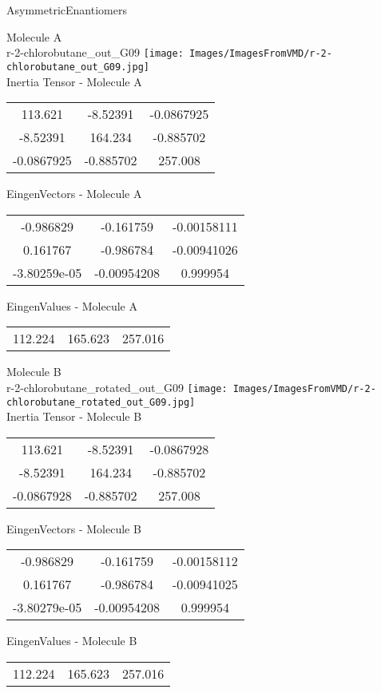 
\vtab[-2cm]
\begin{center}
{\large AsymmetricEnantiomers}
\end{center}
\begin{multicols}{2}
\begin{center}
Molecule A \\ 
r-2-chlorobutane\_out\_G09
\texttt{[image: Images/ImagesFromVMD/r-2-chlorobutane\_out\_G09.jpg]}
\\
Inertia Tensor - Molecule A \\
\vtab
\begin{tabular}{|c c c|}
113.621	 & 	-8.52391	 & 	-0.0867925	 \\
-8.52391	 & 	164.234	 & 	-0.885702	 \\
-0.0867925	 & 	-0.885702	 & 	257.008
\end{tabular}

\vtab
 EingenVectors - Molecule A     \\
\vtab
\begin{tabular}{|c c c|}
-0.986829	 & 	-0.161759	 & 	-0.00158111	 \\
0.161767	 & 	-0.986784	 & 	-0.00941026	 \\
-3.80259e-05	 & 	-0.00954208	 & 	0.999954
\end{tabular}

\vtab
 EingenValues - Molecule A     \\
\vtab
\begin{tabular}{|c c c|}
112.224	 & 	165.623	 & 	257.016
\end{tabular}
\columnbreak

Molecule B \\ 
r-2-chlorobutane\_rotated\_out\_G09
\texttt{[image: Images/ImagesFromVMD/r-2-chlorobutane\_rotated\_out\_G09.jpg]}
\\
Inertia Tensor - Molecule B \\
\vtab
\begin{tabular}{|c c c|}
113.621	 & 	-8.52391	 & 	-0.0867928	 \\
-8.52391	 & 	164.234	 & 	-0.885702	 \\
-0.0867928	 & 	-0.885702	 & 	257.008
\end{tabular}

\vtab
 EingenVectors - Molecule B     \\
\vtab
\begin{tabular}{|c c c|}
-0.986829	 & 	-0.161759	 & 	-0.00158112	 \\
0.161767	 & 	-0.986784	 & 	-0.00941025	 \\
-3.80279e-05	 & 	-0.00954208	 & 	0.999954
\end{tabular}

\vtab
 EingenValues - Molecule B     \\
\vtab
\begin{tabular}{|c c c|}
112.224	 & 	165.623	 & 	257.016
\end{tabular}

\end{center}
\end{multicols}
